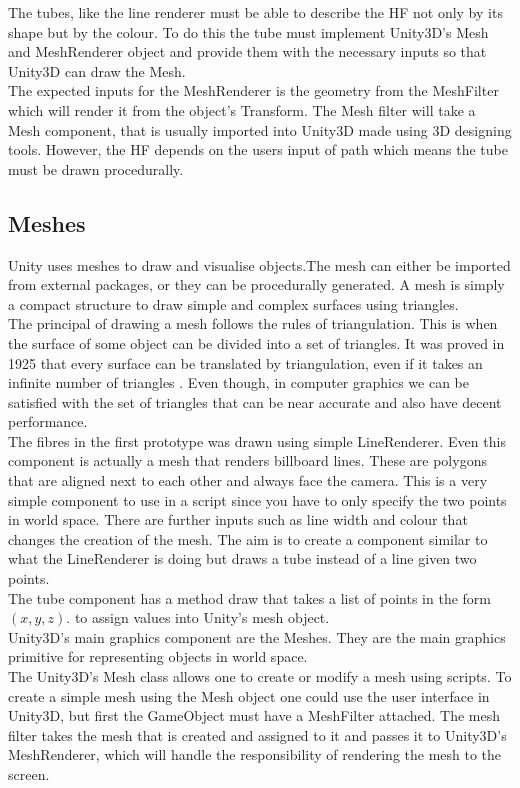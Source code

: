 \documentclass[12pt]{article} %
\begin{document}
\begin{flushleft}
The tubes, like the line renderer must be able to describe the HF not only by its shape but by the colour. To do this the tube must implement Unity3D’s Mesh and MeshRenderer object and provide them with the necessary inputs so that Unity3D can draw the Mesh.\\
The expected inputs for the MeshRenderer is the geometry from the MeshFilter which will render it from the object’s Transform. The Mesh filter will take a Mesh component, that is usually imported into Unity3D made using 3D designing tools. However, the HF depends on the users input of path which means the tube must be drawn procedurally.
\subsection{Meshes} %
Unity uses meshes to draw and visualise objects.The mesh can either be imported from external packages, or they can be procedurally generated. A mesh is simply a compact structure to draw simple and complex surfaces using triangles.\\
The principal of drawing a mesh follows the rules of triangulation. This is when the surface of some object can be divided into a set of triangles. It was proved in 1925 that every surface can be translated by triangulation, even if it takes an infinite number of triangles \cite{Weisstein:t}. Even though, in computer graphics we can be satisfied with the set of triangles that can be near accurate and also have decent performance.\\
The fibres in the first prototype was drawn using simple LineRenderer. Even this component is actually a mesh that renders billboard lines. These are polygons that are aligned next to each other and always face the camera. This is a very simple component to use in a script since you have to only specify the two points in world space. There are further inputs such as line width and colour that changes the creation of the mesh. The aim is to create a component similar to what the LineRenderer is doing but draws a tube instead of a line given two points.\\
The tube component has a method draw that takes a list of points in the form $(x, y, z)$. to assign values into Unity's mesh object.\\
Unity3D's main graphics component are the Meshes. They are the main graphics primitive for representing objects in world space.\\
The Unity3D's Mesh class allows one to create or modify a mesh using scripts. To create a simple mesh using the Mesh object one could use the user interface in Unity3D, but first the GameObject must have a MeshFilter attached. The mesh filter takes the mesh that is created and assigned to it and passes it to Unity3D's MeshRenderer, which will handle the responsibility of rendering the mesh to the screen.\\

\end{flushleft}
\end{document}
